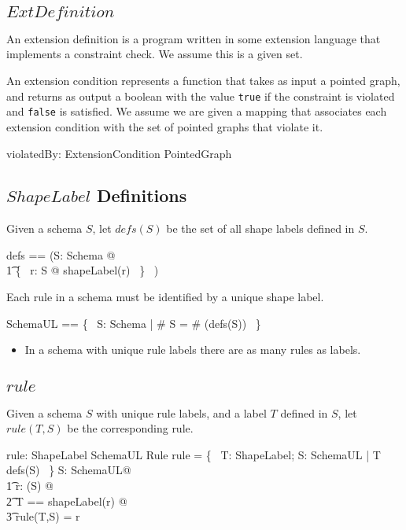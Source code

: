 \documentclass{article}
\begin{document}
\subsection{$ExtDefinition$}
An extension definition is a program written in some extension language that implements a constraint check.
We assume this is a given set.
\begin{zed}
	[ExtDefinition]
\end{zed}

An extension condition represents a function that takes as input a pointed graph, and returns
as output a boolean with the value {\tt true} if the constraint is violated and {\tt false} is satisfied.
We assume we are given a mapping that associates each extension condition with the set of pointed graphs that violate it.
\begin{axdef}
	violatedBy: ExtensionCondition \fun \power PointedGraph
\end{axdef}

\subsection{$ShapeLabel$ Definitions}
Given a schema $S$, let $defs(S)$ be the set of all shape labels defined in $S$.
\begin{zed}
	defs == (\lambda S: Schema @ \\
\t1		\{~ r: \ran S @ shapeLabel(r) ~\} ~)
\end{zed}
 
Each rule in a schema must be identified by a unique shape label.
\begin{zed}
	SchemaUL == \{~ S: Schema | \# S = \# (defs(S)) ~\}
\end{zed}
\begin{itemize}
\item In a schema with unique rule labels there are as many rules as labels.
\end{itemize}

\subsection{$rule$}
Given a schema $S$ with unique rule labels, and a label $T$ defined in $S$, let $rule(T,S)$ be the corresponding rule.
\begin{axdef}
	rule: ShapeLabel \cross SchemaUL \pfun Rule
\where
	\dom rule = \{~ T: ShapeLabel; S: SchemaUL | T \in defs(S) ~\}
\also
	\forall S: SchemaUL@\\
\t1		\forall r: \ran(S) @ \\
\t2			\LET T == shapeLabel(r) @ \\
\t3				rule(T,S) = r
\end{axdef}
\end{document}
